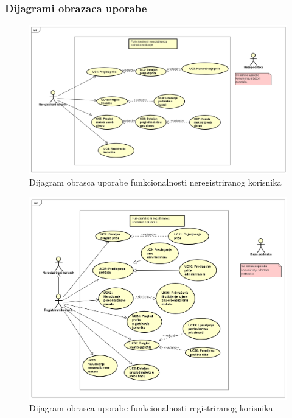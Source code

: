 				\eject
				
				
				\subsubsection{Dijagrami obrazaca uporabe}
					
					
					
					\begin{figure}[h]
						\centering
						\includegraphics[scale=0.32]{"slike/Funkcionalnost neregistriranog korisnika"}
						\caption{Dijagram obrasca uporabe funkcionalnosti neregistriranog korisnika}
						\label{fig:funkcionalnost-neregistriranog-korisnika}   
					\end{figure}
					
					\begin{figure}
						\centering
						\includegraphics[scale=0.34]{"slike/Funkcionalnost registriranog korisnika"}
						\caption{Dijagram obrasca uporabe funkcionalnosti registriranog korisnika}
						\label{fig:funkcionalnost-registriranog-korisnika}
					\end{figure}
					
